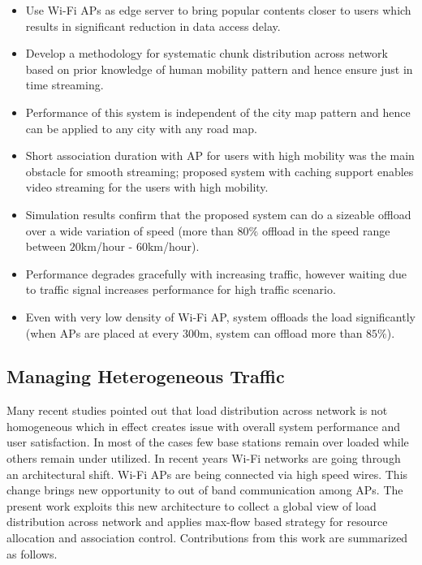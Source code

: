 \begin{itemize}
\item Use Wi-Fi APs as edge server to bring popular contents closer to users which results in significant reduction in data access delay.\\
\item Develop a methodology for systematic chunk distribution across network based on prior knowledge of human mobility pattern and hence ensure just in time streaming.\\
\item Performance of this system is independent of the city map pattern and hence can be applied to any city with any road map.\\
\item Short association duration with AP for users with high mobility was the main obstacle for smooth streaming; proposed system with caching support enables video streaming for the users with high mobility.\\
\item Simulation results confirm that the proposed system can do a sizeable offload over a wide variation of speed (more than $80\%$ offload in the speed range between $20$km/hour - $60$km/hour). \\
\item Performance degrades gracefully with increasing traffic, however waiting due to traffic signal increases performance for high traffic scenario.\\
\item Even with very low density of Wi-Fi AP, system offloads the load significantly (when APs are placed at every 300m, system can offload more than $85\%$).\\
\end{itemize}
\subsection{Managing Heterogeneous Traffic} Many recent studies pointed out that load distribution across network is not homogeneous which in effect creates issue with overall system performance and user satisfaction. In most of the cases few base stations remain over loaded while others remain under utilized. In recent years Wi-Fi networks are going through an architectural shift. Wi-Fi APs are being connected via high speed wires. This change brings new opportunity to out of band communication among APs. The present work exploits this new architecture to collect a global view of load distribution across network and applies max-flow based strategy for resource allocation and association control. Contributions from this work are summarized as follows. 


